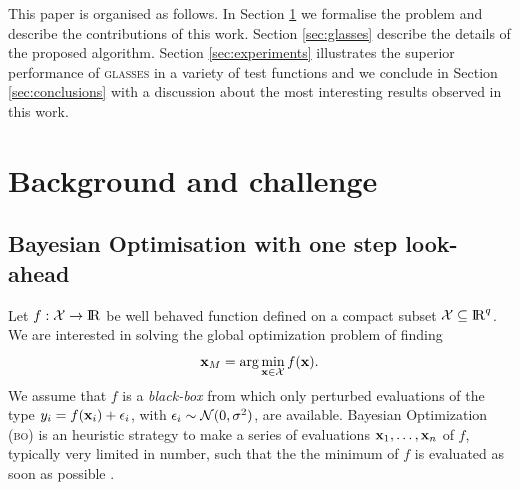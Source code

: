 \documentclass[twoside]{article}
\def\bbbr{{\rm I\!R}}
\newcommand{\acr}[1]{\textsc{#1}\xspace}
\newcommand{\us}{\acr{glasses}}
\newcommand{\bo}{\acr{bo}}
\begin{document}

This paper is organised as follows. In Section \ref{sec:background} we formalise the problem and describe the contributions of this work. Section \ref{sec:glasses} describe the details of the proposed algorithm. Section \ref{sec:experiments} illustrates the superior performance of \us in a variety of test functions and we conclude in Section \ref{sec:conclusions} with a discussion about the most interesting results observed in this work.


\section{Background and challenge}\label{sec:background}
\subsection{Bayesian Optimisation with one step look-ahead} %
\label{sec:bayesian_optimisation}



Let $f: {\mathcal X} \to \bbbr$ be well behaved function defined on a compact subset ${\mathcal X} \subseteq \bbbr^{\inputDim}$. We are interested in solving the global optimization problem of finding 
$$\mathbf{x}_{M} = \arg \min_{\mathbf{x} \in {\mathcal X}} f(\mathbf{x}).$$ 
We assume that $f$ is a \emph{black-box} from which only perturbed evaluations of the type $y_i = f(\mathbf{x}_i) + \epsilon_i$, with $\epsilon_i \sim\mathcal{N}(0,\sigma^2)$, are  available. Bayesian Optimization (\bo) is an heuristic strategy to make a series of evaluations $\mathbf{x}_1,\dots,\mathbf{x}_n$ of $f$, typically very limited in number,  such that the the minimum of $f$ is evaluated as soon as possible \citep{Lizotte_2008,Jones_2001,Snoek*Larochelle*Adams_2012,Brochu*Cora*DeFreitas_2010}.
\end{document}
